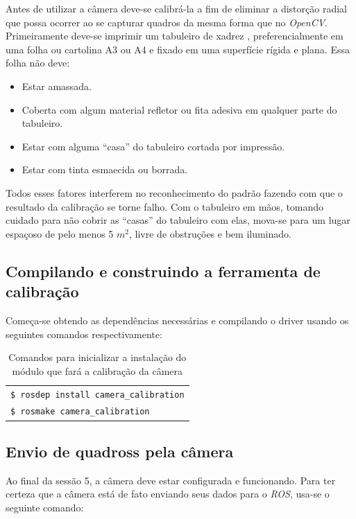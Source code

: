 Antes de utilizar a câmera deve-se calibrá-la a fim de eliminar a distorção radial que possa ocorrer ao se capturar quadros da mesma forma que no \textit{OpenCV}.
Primeiramente deve-se imprimir um tabuleiro de xadrez \cite{Setup-CalibrateMonocularCamera}, preferencialmente em uma folha ou cartolina A3 ou A4 e fixado em uma superfície rígida e plana. Essa folha não deve: 

\begin{itemize}
	\item{Estar amassada.}
	\item{Coberta com algum material refletor ou fita adesiva em qualquer parte do tabuleiro.}
	\item{Estar com alguma “casa” do tabuleiro cortada por impressão.}
	\item{Estar com tinta esmaecida ou borrada.}
\end{itemize}	

Todos esses fatores interferem no reconhecimento do padrão fazendo com que o resultado da calibração se torne falho. Com o tabuleiro em mãos, tomando cuidado para não cobrir as “casas” do tabuleiro com elas, mova-se para um lugar espaçoso de pelo menos 5 $m^2$, livre de obstruções e bem iluminado.

\subsection{Compilando e construindo a ferramenta de calibração}

Começa-se obtendo as dependências necessárias e compilando o driver usando os seguintes comandos respectivamente:

\begin{table}[!ht]\label{tb:1}
\begin{tabular}{| p{\textwidth}|}
\hline
\texttt{\$ rosdep install camera\_calibration} \\
\texttt{\$ rosmake camera\_calibration} \\ \hline
\end{tabular}
\caption{Comandos para inicializar a instalação do módulo que fará a calibração da câmera}
\end{table}


\subsection{Envio de quadross pela câmera}

Ao final da sessão 5, a câmera deve estar configurada e funcionando. Para ter certeza que a câmera está de fato enviando seus dados para o \textit{ROS}, usa-se o seguinte comando:

